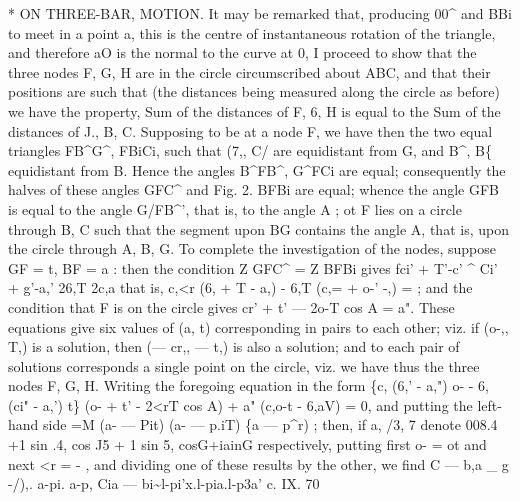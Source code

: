 \documentclass[11pt,a4paper]{book}
\begin{document}
*
ON THREE-BAR, MOTION.
It may be
remarked
that,
producing
00\textasciicircum{}
and BBi
to meet
in
a
point
a, this
is
the
centre
of instantaneous rotation of
the
triangle, and
therefore aO
is
the normal
to
the curve at
0,
I
proceed
to
show
that
the
three
nodes
F,
G, H
are
in
the
circle
circumscribed
about ABC, and
that
their
positions are such that (the distances being measured along
the
circle
as
before) we
have the property, Sum
of
the
distances
of F,
6, H
is
equal
to the Sum of the distances of J., B,
C.
Supposing
to
be
at
a
node
F,
we
have
then
the
two
equal
triangles
FB\textasciicircum{}G\textasciicircum{},
FBiCi, such
that
(7,, C/ are equidistant from
G, and B\textasciicircum{}, B\{ equidistant from
B.
Hence
the
angles
B\textasciicircum{}FB\textasciicircum{}, G\textasciicircum{}FCi
are
equal;
consequently
the halves of
these angles GFC\textasciicircum{}
and
Fig.
2.
BFBi
are
equal; whence the angle GFB
is
equal
to
the
angle G/FB\textasciicircum{}', that
is,
to
the
angle A
;
ot F
lies
on
a
circle
through B, C such
that
the segment upon BG contains
the angle A, that
is, upon
the
circle
through
A, B,
G.
To complete
the
investigation
of the
nodes, suppose GF = t, BF = a
:
then the condition
Z GFC\textasciicircum{} = Z BFBi
gives
fci' + T'-c' \textasciicircum{}
Ci' + g'-a,'
26,T
2c,a
that
is,
c,<r (6,\guillemotright{} + T\guillemotright{} - a,\guillemotright{}) - 6,T (c,= + o-' -\guillemotleft{},\guillemotright{}) =
;
and the condition that F is on the
circle gives
cr' + t' --- 2o-T cos A = a".
These
equations
give
six
values of
(a,
t) corresponding
in
pairs
to
each other;
viz.
if
(o-,,
T,)
is
a
solution, then
(--- cr,, --- t,)
is
also a
solution;
and
to each
pair of solutions
corresponds a single point on the
circle,
viz. we have thus
the three nodes F,
G, H.
Writing the
foregoing equation in the form
\{c, (6,' - a,") o- - 6, (ci" - a,') t\} (o-\guillemotright{} + t' - 2<rT cos A) + a" (c,o-t\guillemotright{} - 6,aV) = 0,
and
putting
the
left-hand
side =M (a- --- Pit) (a- --- p.iT) \{a --- p\textasciicircum{}r)
;
then,
if
a,
/3, 7
denote
008.4 +1 sin .4,
cos J5 + 1 sin 5, cosG+iainG
respectively,
putting
first
o- = ot
and
next
<r = -
, and
dividing
one
of
these
results
by
the
other, we
find
C --- b,a \_
g -/),. a-pi. a-p,
Cia --- bi\textasciitilde{}l-pi'x.l-pia.l-p3a'
c.
IX.
70
\end{document}
